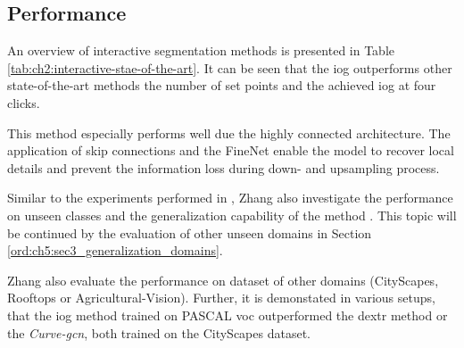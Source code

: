 \subsection{Performance}\label{ord:ch3:sec4:subsec5}

An overview of interactive segmentation methods is presented in Table \ref{tab:ch2:interactive-stae-of-the-art}.
It can be seen that the \gls{iog} outperforms other state-of-the-art methods the number of set points and the achieved \gls{iog} at four clicks.

This method especially performs well due the highly connected architecture.
The application of skip connections and the FineNet enable the model to recover local details and prevent the information loss during down- and upsampling process.

Similar to the experiments performed in \cite{Man18-DEXTR}, Zhang \etal also investigate the performance on unseen classes and the generalization capability of the method \Cite{Zha20-IOG}. 
This topic will be continued by the evaluation of other unseen domains in Section \ref{ord:ch5:sec3_generalization_domains}.

Zhang \etal also evaluate the performance on dataset of other domains (\eg CityScapes, Rooftops or Agricultural-Vision).
Further, it is demonstated in various setups, that the \gls{iog} method trained on PASCAL \gls{voc} outperformed the \gls{dextr} method or the \textit{Curve-\gls{gcn}}, both trained on the CityScapes dataset.

